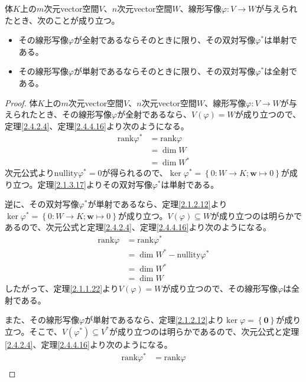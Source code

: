 \documentclass[dvipdfmx]{jsarticle}
\begin{document}
\begin{thm}\label{2.4.4.17}
体$K$上の$m$次元vector空間$V$、$n$次元vector空間$W$、線形写像$\varphi:V \rightarrow W$が与えられたとき、次のことが成り立つ。
\begin{itemize}
\item
  その線形写像$\varphi$が全射であるならそのときに限り、その双対写像$\varphi^{*}$は単射である。
\item
  その線形写像$\varphi$が単射であるならそのときに限り、その双対写像$\varphi^{*}$は全射である。
\end{itemize}
\end{thm}
\begin{proof}
体$K$上の$m$次元vector空間$V$、$n$次元vector空間$W$、線形写像$\varphi:V \rightarrow W$が与えられたとき、その線形写像$\varphi$が全射であるなら、$V(\varphi) = W$が成り立つので、定理\ref{2.4.2.4}、定理\ref{2.4.4.16}より次のようになる。
\begin{align*}
\mathrm{rank} \varphi^{*}  &= \mathrm{rank} \varphi \\
&= \dim W\\
&= \dim W^{*}
\end{align*}
次元公式より$\mathrm{nullity} \varphi^{*} = 0$が得られるので、$\ker\varphi^{*} = \left\{ 0:W \rightarrow K;\mathbf{w} \mapsto 0 \right\}$が成り立つ。定理\ref{2.1.3.17}よりその双対写像$\varphi^{*}$は単射である。\par
逆に、その双対写像$\varphi^{*}$が単射であるなら、定理\ref{2.1.2.12}より$\ker\varphi^{*} = \left\{ 0:W \rightarrow K;\mathbf{w} \mapsto 0 \right\}$が成り立つ。$V(\varphi) \subseteq W$が成り立つのは明らかであるので、次元公式と定理\ref{2.4.2.4}、定理\ref{2.4.4.16}より次のようになる。
\begin{align*}
\mathrm{rank} \varphi &= \mathrm{rank} \varphi^{*} \\
&= \dim W^{*} - \mathrm{nullity} \varphi^{*} \\
&= \dim W^{*}\\
&= \dim W
\end{align*}
したがって、定理\ref{2.1.1.22}より$V(\varphi) = W$が成り立つので、その線形写像$\varphi$は全射である。\par
また、その線形写像$\varphi$が単射であるなら、定理\ref{2.1.2.12}より$\ker\varphi = \left\{ \mathbf{0} \right\}$が成り立つ。そこで、$V\left( \varphi^{*} \right) \subseteq V^{*}$が成り立つのは明らかであるので、次元公式と定理\ref{2.4.2.4}、定理\ref{2.4.4.16}より次のようになる。
\begin{align*}
\mathrm{rank} \varphi^{*} &= \mathrm{rank} \varphi \\

\end{align*}
\end{proof}
\end{document}
